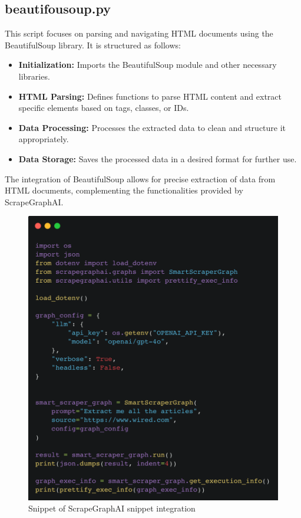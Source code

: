 \subsection{beautifousoup.py}

This script focuses on parsing and navigating HTML documents using the BeautifulSoup library. It is structured as follows:

\begin{itemize}
    \item \textbf{Initialization:} Imports the BeautifulSoup module and other necessary libraries.
    \item \textbf{HTML Parsing:} Defines functions to parse HTML content and extract specific elements based on tags, classes, or IDs.
    \item \textbf{Data Processing:} Processes the extracted data to clean and structure it appropriately.
    \item \textbf{Data Storage:} Saves the processed data in a desired format for further use.
\end{itemize}

The integration of BeautifulSoup allows for precise extraction of data from HTML documents, complementing the functionalities provided by ScrapeGraphAI.

\begin{figure}[h!]
    \centering
    \includegraphics[width=0.95\linewidth]{Assets/smart_scraper_wired.png}
    \caption{Snippet of ScrapeGraphAI snippet integration}
    \label{fig:smart_scraper_wired}
\end{figure}

